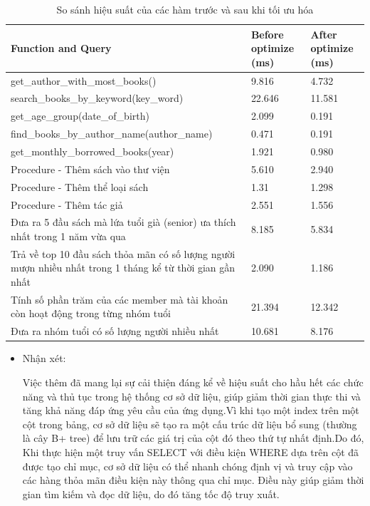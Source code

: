 \documentclass[12pt]{article}
\begin{document}
\begin{table}[ht]
\centering
\begin{tabular}{|p{10cm}|p{2cm}|p{2cm}|}
    \hline
    \centering \textbf{Function and Query} & \textbf{Before optimize (ms)} & \textbf{After optimize (ms)} \\
    \hline
    get\_author\_with\_most\_books() & 9.816 & 4.732  \\
    \hline
    search\_books\_by\_keyword(key\_word) & 22.646  & 11.581  \\
    \hline
    get\_age\_group(date\_of\_birth) & 2.099  & 0.191  \\
    \hline
    find\_books\_by\_author\_name(author\_name) & 0.471  & 0.191  \\
    \hline
    get\_monthly\_borrowed\_books(year) & 1.921  & 0.980  \\
    \hline
    Procedure - Thêm sách vào thư viện & 5.610  & 2.940  \\
    \hline
    Procedure - Thêm thể loại sách & 1.31 & 1.298  \\
    \hline
    Procedure - Thêm tác giả & 2.551 & 1.556  \\
    \hline
    Đưa ra 5 đầu sách mà lứa tuổi già (senior) ưa thích nhất trong 1 năm vừa qua & 8.185  & 5.834  \\
    \hline
    Trả về top 10 đầu sách thỏa mãn có số lượng người mượn nhiều nhất trong 1 tháng kể từ thời gian gần nhất & 2.090 & 1.186 \\
    \hline
    Tính số phần trăm của các member mà tài khoản còn hoạt động trong từng nhóm tuổi & 21.394  & 12.342  \\
    \hline
    Đưa ra nhóm tuổi có số lượng người nhiều nhất & 10.681  & 8.176 \\
    \hline
\end{tabular}
\caption{So sánh hiệu suất của các hàm trước và sau khi tối ưu hóa}
\end{table}
\begin{itemize}
    \item Nhận xét: 
    
    Việc thêm  đã mang lại sự cải thiện đáng kể về hiệu suất cho hầu hết các chức năng và thủ tục trong hệ thống cơ sở dữ liệu, giúp giảm thời gian thực thi và tăng khả năng đáp ứng yêu cầu của ứng dụng.Vì khi tạo một index trên một cột trong bảng, cơ sở dữ liệu sẽ tạo ra một cấu trúc dữ liệu bổ sung (thường là cây B+ tree) để lưu trữ các giá trị của cột đó theo thứ tự nhất định.Do đó, Khi thực hiện một truy vấn SELECT với điều kiện WHERE dựa trên cột đã được tạo chỉ mục, cơ sở dữ liệu có thể nhanh chóng định vị và truy cập vào các hàng thỏa mãn điều kiện này thông qua chỉ mục. Điều này giúp giảm thời gian tìm kiếm và đọc dữ liệu, do đó tăng tốc độ truy xuất.
\end{itemize}
\end{document}
